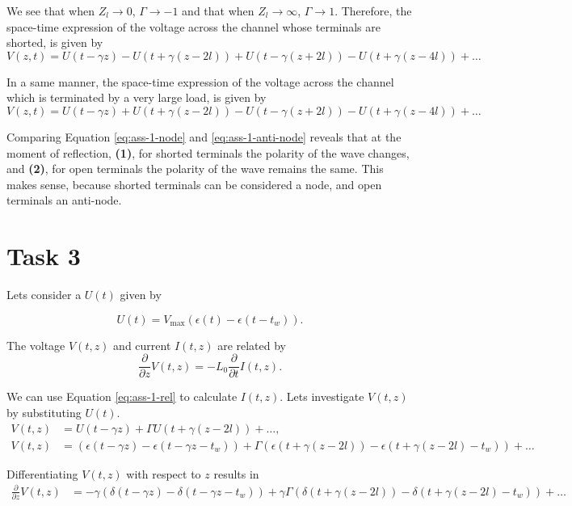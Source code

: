 \documentclass[11pt,titlepage]{report}
\begin{document}
We see that when $Z_l \to 0$, $\Gamma \to -1$ and that when $Z_l \to \infty$, $\Gamma \to 1$. Therefore, the space-time expression of the voltage across the channel whose terminals are shorted, is given by
\begin{equation} \label{eq:ass-1-node}
	V(z,t)=U(t- \gamma z) - U(t+ \gamma(z-2l)) + U (t- \gamma(z + 2l)) -U(t + \gamma (z-4l)) + \dots
\end{equation}

In a same manner, the space-time expression of the voltage across the channel which is terminated by a very large load, is given by
\begin{equation} \label{eq:ass-1-anti-node}
	V(z,t)=U(t- \gamma z) + U(t+ \gamma(z-2l)) - U (t- \gamma(z + 2l)) - U(t + \gamma (z-4l)) + \dots
\end{equation}

Comparing Equation \ref{eq:ass-1-node} and \ref{eq:ass-1-anti-node} reveals that at the moment of reflection, \textbf{(1)}, for shorted terminals the polarity of the wave changes, and \textbf{(2)}, for open terminals the polarity of the wave remains the same. This makes sense, because shorted terminals can be considered a node, and open terminals an anti-node.

\section{Task 3}
Lets consider a $U(t)$ given by

\begin{equation}
	U(t) = V_{\text{max}}(\epsilon(t)-\epsilon(t-t_w)).
\end{equation}

The voltage $V(t,z)$ and current $I(t,z)$ are related by
\begin{equation} \label{eq:ass-1-rel}
	\frac{\partial}{\partial z} V(t,z) = - L_0 \frac{\partial}{\partial t} I(t,z).
\end{equation}

We can use Equation \ref{eq:ass-1-rel} to calculate $I(t,z)$. Lets investigate $V(t,z)$ by substituting $U(t)$.
\begin{align}
	V(t,z) &= U(t- \gamma z) + \Gamma U(t+ \gamma( z - 2l)) + \dots, \\
	V(t,z) &= \left(\epsilon(t- \gamma z) - \epsilon(t - \gamma z - t_w) \right) + \Gamma \left( \epsilon(t + \gamma(z-2l)) - \epsilon(t+ \gamma (z-2l)-t_w)\right) + \dots
\end{align}

Differentiating $V(t,z)$ with respect to $z$ results in
\begin{align}
	\frac{\partial}{\partial z}V(t,z) &= -\gamma \left(\delta(t- \gamma z) - \delta(t - \gamma z - t_w) \right) + \gamma \Gamma \left( \delta(t + \gamma(z-2l)) - \delta(t+ \gamma (z-2l)-t_w)\right) + \dots
\end{align}
\end{document}
